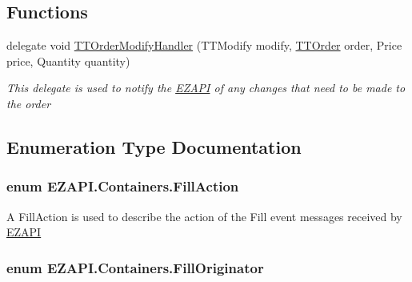 \subsection*{Functions}
\begin{DoxyCompactItemize}
\item 
delegate void \hyperlink{namespace_e_z_a_p_i_1_1_containers_aeae814d91b819efed065a366c6f45cf2}{T\-T\-Order\-Modify\-Handler} (T\-T\-Modify modify, \hyperlink{class_e_z_a_p_i_1_1_containers_1_1_t_t_order}{T\-T\-Order} order, Price price, Quantity quantity)
\begin{DoxyCompactList}\small\item\em This delegate is used to notify the \hyperlink{namespace_e_z_a_p_i}{E\-Z\-A\-P\-I} of any changes that need to be made to the order \end{DoxyCompactList}\end{DoxyCompactItemize}


\subsection{Enumeration Type Documentation}
\hypertarget{namespace_e_z_a_p_i_1_1_containers_ac44efd9b58d9e3746dcc24b165d19169}{
\subsubsection[{Fill\-Action}]{\setlength{\rightskip}{0pt plus 5cm}enum {\bf E\-Z\-A\-P\-I.\-Containers.\-Fill\-Action}}}\label{namespace_e_z_a_p_i_1_1_containers_ac44efd9b58d9e3746dcc24b165d19169}


A Fill\-Action is used to describe the action of the Fill event messages received by \hyperlink{namespace_e_z_a_p_i}{E\-Z\-A\-P\-I} 

\hypertarget{namespace_e_z_a_p_i_1_1_containers_ac4a10657ec0024847b9518e0ad75e16e}{
\subsubsection[{Fill\-Originator}]{\setlength{\rightskip}{0pt plus 5cm}enum {\bf E\-Z\-A\-P\-I.\-Containers.\-Fill\-Originator}}}\label{namespace_e_z_a_p_i_1_1_containers_ac4a10657ec0024847b9518e0ad75e16e}


